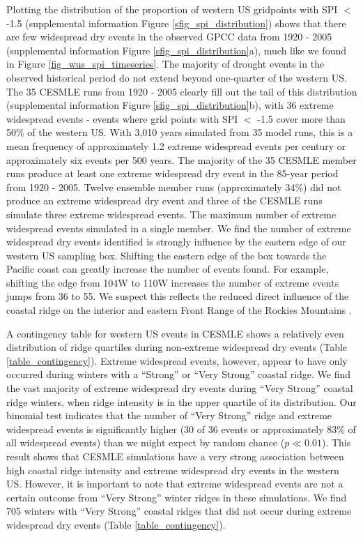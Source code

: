 \documentclass[final, double]{ua-thesis}
\begin{document}
Plotting the distribution of the proportion of western US gridpoints with SPI $<$ -1.5 (supplemental information Figure \ref{sfig_spi_distribution}) shows that there are few widespread dry events in the observed GPCC data from 1920 - 2005 (supplemental information Figure \ref{sfig_spi_distribution}a), much like we found in Figure \ref{fig_wus_spi_timeseries}. The majority of drought events in the observed historical period do not extend beyond one-quarter of the western US. The 35 CESMLE runs from 1920 - 2005 clearly fill out the tail of this distribution (supplemental information Figure \ref{sfig_spi_distribution}b), with 36 extreme widespread events - events where grid points with SPI $<$ -1.5 cover more than 50\% of the western US. With 3,010 years simulated from 35 model runs, this is a mean frequency of approximately 1.2 extreme widespread events per century or approximately six events per 500 years. The majority of the 35 CESMLE member runs produce at least one extreme widespread dry event in the 85-year period from 1920 - 2005. Twelve ensemble member runs (approximately 34\%) did not produce an extreme widespread dry event and three of the CESMLE runs simulate three extreme widespread events. The maximum number of extreme widespread events simulated in a single member. We find the number of extreme widespread dry events identified is strongly influence by the eastern edge of our western US sampling box. Shifting the eastern edge of the box towards the Pacific coast can greatly increase the number of events found. For example, shifting the edge from 104\textdegree W to 110\textdegree W increases the number of extreme events jumps from 36 to 55. We suspect this %
reflects the reduced direct influence of the coastal ridge on the interior and eastern Front Range of the Rockies Mountains \citet[e.g., ][]{3changnon_hydroclimatic_1991, 3malevich_importance_2017}.

A contingency table for western US events in CESMLE shows a relatively even distribution of ridge quartiles during non-extreme widespread dry events (Table \ref{table_contingency}). Extreme widespread events, however, appear to have only occurred during winters with a ``Strong'' or ``Very Strong'' coastal ridge. We find the vast majority of extreme widespread dry events during ``Very Strong'' coastal ridge winters, when ridge intensity is in the upper quartile of its distribution. Our binomial test indicates that the number of ``Very Strong'' ridge and extreme widespread events is significantly higher (30 of 36 events or approximately 83\% of all widespread events) than we might expect by random chance ($p \ll 0.01$). This result shows that CESMLE simulations have a very strong association between high coastal ridge intensity and extreme widespread dry events in the western US. However, it is important to note that extreme widespread events are not a certain outcome from ``Very Strong'' winter ridges in these simulations. We find 705 winters with ``Very Strong'' coastal ridges that did not occur during extreme widespread dry events (Table \ref{table_contingency}).
\end{document}
